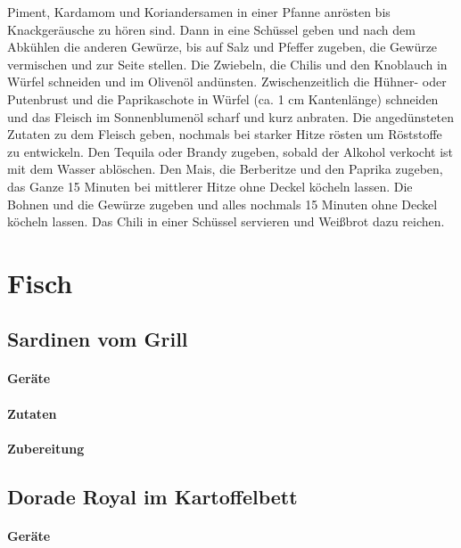 Piment, Kardamom und Koriandersamen in einer Pfanne anrösten bis Knackgeräusche zu hören sind. Dann in eine Schüssel geben und nach dem Abkühlen die anderen Gewürze, bis auf Salz und Pfeffer zugeben, die Gewürze vermischen und zur Seite stellen.
Die Zwiebeln, die Chilis und den Knoblauch in Würfel schneiden und im Olivenöl andünsten. Zwischenzeitlich die Hühner- oder Putenbrust und die Paprikaschote in Würfel (ca. 1 cm Kantenlänge) schneiden und das Fleisch im Sonnenblumenöl scharf und kurz anbraten.
Die angedünsteten Zutaten zu dem Fleisch geben, nochmals bei starker Hitze rösten um Röststoffe zu entwickeln. Den Tequila oder Brandy zugeben, sobald der Alkohol verkocht ist mit dem Wasser ablöschen. Den Mais, die Berberitze  und den Paprika zugeben, das Ganze 15 Minuten bei mittlerer Hitze ohne Deckel köcheln lassen.  
Die Bohnen und die Gewürze zugeben und alles nochmals 15 Minuten ohne Deckel köcheln lassen.
Das Chili in einer Schüssel servieren und Weißbrot dazu reichen.


\section{Fisch}

\subsection{Sardinen vom Grill}


\paragraph{Geräte}

\paragraph{Zutaten}

\paragraph{Zubereitung}

\subsection{Dorade Royal im Kartoffelbett}

\paragraph{Geräte}

